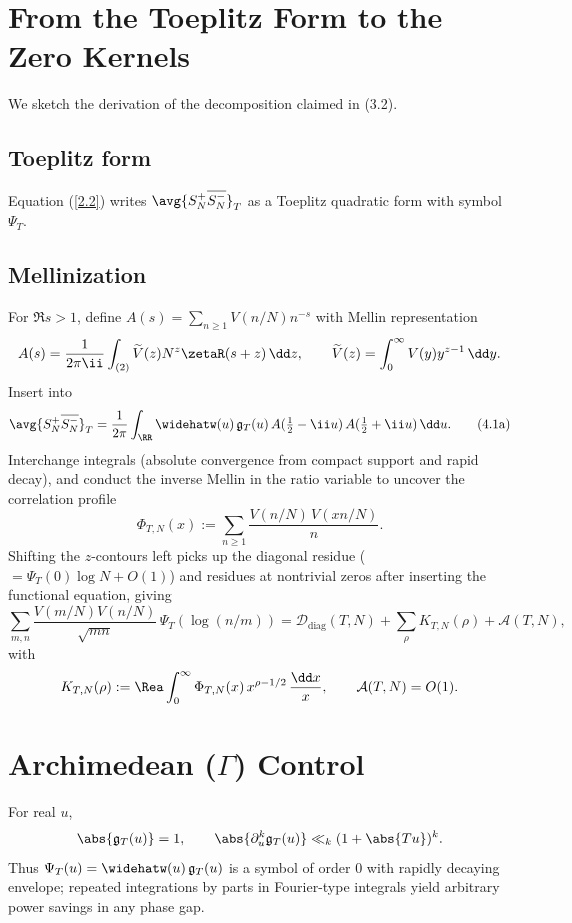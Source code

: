 \appendix

\section{From the Toeplitz Form to the Zero Kernels} \label{app:explicit}
We sketch the derivation of the decomposition claimed in (3.2).

\subsection{Toeplitz form}
Equation (\ref{2.2}) writes $\avg{ S_N^+\overline{S_N^-}}_T$ as a Toeplitz quadratic form with symbol $\Psi_T$.

\subsection{Mellinization}
For $\Re s>1$, define $A(s)=\sum_{n\ge1} V(n/N) n^{-s}$ with Mellin representation
\[
A(s)=\frac{1}{2\pi \ii}\int_{(2)} \widetilde V(z) N^z \zetaR(s+z)\,\dd z,\qquad \widetilde V(z)=\int_0^\infty V(y) y^{z-1}\,\dd y.
\]
Insert into
\[
\avg{ S_N^+\overline{S_N^-}}_T=\frac{1}{2\pi}\int_{\RR}\widehatw(u)\,\mathfrak g_T(u)\,A(\tfrac12-\ii u)\,A(\tfrac12+\ii u)\,\dd u.
\tag{4.1a}
\]
Interchange integrals (absolute convergence from compact support and rapid decay), and conduct the inverse Mellin in the ratio variable to uncover the correlation profile
\begin{equation}
\Phi_{T,N}(x):=\sum_{n\ge1} \frac{V(n/N)\,V(xn/N)}{n}.
\tag{3.3a}
\end{equation}
Shifting the $z$-contours left picks up the diagonal residue ($=\Psi_T(0)\log N+O(1)$) and residues at nontrivial zeros after inserting the functional equation, giving
\begin{equation}
\sum_{m,n}\frac{V(m/N)V(n/N)}{\sqrt{mn}}\,\Psi_T(\log(n/m))
=\mathcal D_{\mathrm{diag}}(T,N)+\sum_{\rho}K_{T,N}(\rho)+\mathcal A(T,N),
\tag{3.2}
\end{equation}
with
\[
K_{T,N}(\rho):=\Rea\int_0^\infty \Phi_{T,N}(x)\,x^{\rho-1/2}\,\frac{\dd x}{x},\qquad \mathcal A(T,N)=O(1).
\]

\section{Archimedean (\texorpdfstring{$\Gamma$}{Gamma}) Control} \label{app:arch}
For real $u$,
\[
\abs{\mathfrak g_T(u)}=1,\qquad \abs{\partial_u^k \mathfrak g_T(u)}\ll_k (1+\abs{Tu})^k.
\]
Thus $\Psi_T(u)=\widehatw(u)\,\mathfrak g_T(u)$ is a symbol of order $0$ with rapidly decaying envelope; repeated integrations by parts in Fourier-type integrals yield arbitrary power savings in any phase gap.

